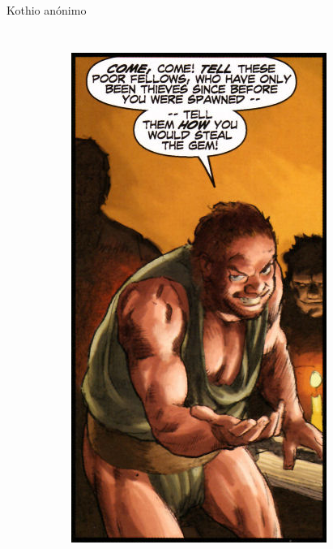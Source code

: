 \begin{frame}{Kothio anónimo}
\begin{columns}
\begin{figure}[htp]
\begin{subfigure}[b]{0.25\textwidth}
   \includegraphics[width=\textwidth]{img/khotio/DH}
 \end{subfigure}
~
 \begin{subfigure}[b]{0.25\textwidth}

\end{subfigure}
\end{figure}
\end{columns}
\end{frame}
